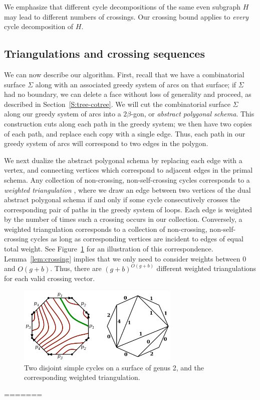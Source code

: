 \documentclass[11pt,twoside]{article}
\begin{document}
We emphasize that different cycle decompositions of the same even subgraph $H$ may lead to different numbers of crossings.  Our crossing bound applies to \emph{every} cycle decomposition of $H$.

\subsection{Triangulations and crossing sequences}
\label{SS:homotopy-triangulation}


We can now describe our algorithm.  First, recall that we have a combinatorial surface $\Sigma$ along with an associated greedy system of arcs on that surface; if  $\Sigma$ had no boundary, we can delete a face without loss of generality and proceed, as described in Section~\ref{S:tree-cotree}.
We will cut the combinatorial surface $\Sigma$ along our greedy system of arcs into a $2\beta$-gon, or \emph{abstract polygonal schema}.  This construction cuts along each path in the greedy system; we then have two copies of each path,  and replace each copy  with a single edge.  Thus, each path in our greedy system of arcs will correspond to two edges in the polygon.

We next dualize the abstract polygonal schema by replacing each edge with a vertex, and connecting vertices which correspond to adjacent edges in the primal schema.  Any collection of non-crossing, non-self-crossing cycles corresponds to a \emph{weighted triangulation} \cite{ccelw-scsih-08}, where we draw an edge between two vertices of the dual abstract polygonal schema if and only if some cycle consecutively crosses the corresponding pair of paths in the greedy system of loops.  Each edge is weighted by the number of times such a crossing occurs in our collection.  Conversely, a weighted triangulation corresponds to a collection of non-crossing, non-self-crossing cycles as long as corresponding vertices are incident to edges of equal total weight.  See Figure~\ref{fig:weightedtriangulation} for an illustration of this correspondence.  Lemma~\ref{lem:crossing} implies that we only need to consider weights between 0 and $O(g+b)$.  Thus, there are $(g+b)^{O(g+b)}$ different weighted triangulations for each valid crossing vector.


\begin{figure}[htb]
\centering\includegraphics[height=1.45in]{Fig/triangulation}
\caption{Two disjoint simple cycles on a surface of genus 2, and the corresponding weighted triangulation.}
\label{fig:weightedtriangulation}
\end{figure}
=======
\end{document}
